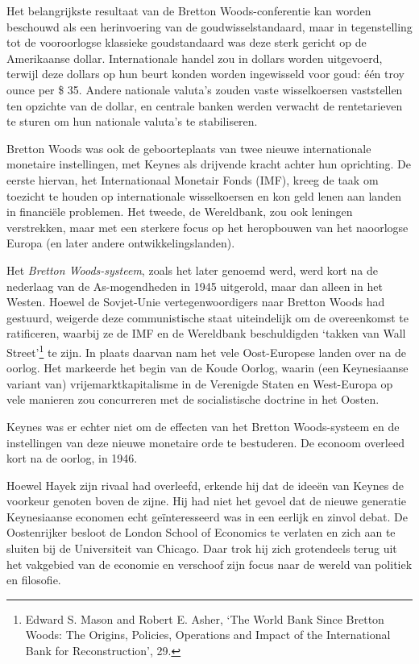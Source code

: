 \documentclass[
  a5paper,
  smalldemyvopaper,11pt,twoside,onecolumn,openright,extrafontsizes]{memoir}
\begin{document}
Het belangrijkste resultaat van de Bretton Woods-conferentie kan worden
beschouwd als een herinvoering van de goudwisselstandaard, maar in
tegenstelling tot de vooroorlogse klassieke goudstandaard was deze sterk
gericht op de Amerikaanse dollar. Internationale handel zou in dollars
worden uitgevoerd, terwijl deze dollars op hun beurt konden worden
ingewisseld voor goud: één troy ounce per \$ 35. Andere nationale
valuta's zouden vaste wisselkoersen vaststellen ten opzichte van de
dollar, en centrale banken werden verwacht de rentetarieven te sturen om
hun nationale valuta's te stabiliseren.

Bretton Woods was ook de geboorteplaats van twee nieuwe internationale
monetaire instellingen, met Keynes als drijvende kracht achter hun
oprichting. De eerste hiervan, het Internationaal Monetair Fonds (IMF),
kreeg de taak om toezicht te houden op internationale wisselkoersen en
kon geld lenen aan landen in financiële problemen. Het tweede, de
Wereldbank, zou ook leningen verstrekken, maar met een sterkere focus op
het heropbouwen van het naoorlogse Europa (en later andere
ontwikkelingslanden).

Het \emph{Bretton Woods-systeem}, zoals het later genoemd werd, werd
kort na de nederlaag van de As-mogendheden in 1945 uitgerold, maar dan
alleen in het Westen. Hoewel de Sovjet-Unie vertegenwoordigers naar
Bretton Woods had gestuurd, weigerde deze communistische staat
uiteindelijk om de overeenkomst te ratificeren, waarbij ze de IMF en de
Wereldbank beschuldigden `takken van Wall Street'\footnote{\hspace{0pt}Edward
  S. Mason and Robert E. Asher, `The World Bank Since Bretton Woods: The
  Origins, Policies, Operations and Impact of the International Bank for
  Reconstruction', 29.} te zijn. In plaats daarvan nam het vele
Oost-Europese landen over na de oorlog. Het markeerde het begin van de
Koude Oorlog, waarin (een Keynesiaanse variant van)
vrijemarktkapitalisme in de Verenigde Staten en West-Europa op vele
manieren zou concurreren met de socialistische doctrine in het Oosten.

Keynes was er echter niet om de effecten van het Bretton Woods-systeem
en de instellingen van deze nieuwe monetaire orde te bestuderen. De
econoom overleed kort na de oorlog, in 1946.

Hoewel Hayek zijn rivaal had overleefd, erkende hij dat de ideeën van
Keynes de voorkeur genoten boven de zijne. Hij had niet het gevoel dat
de nieuwe generatie Keynesiaanse economen echt geïnteresseerd was in een
eerlijk en zinvol debat. De Oostenrijker besloot de London School of
Economics te verlaten en zich aan te sluiten bij de Universiteit van
Chicago. Daar trok hij zich grotendeels terug uit het vakgebied van de
economie en verschoof zijn focus naar de wereld van politiek en
filosofie.
\end{document}

